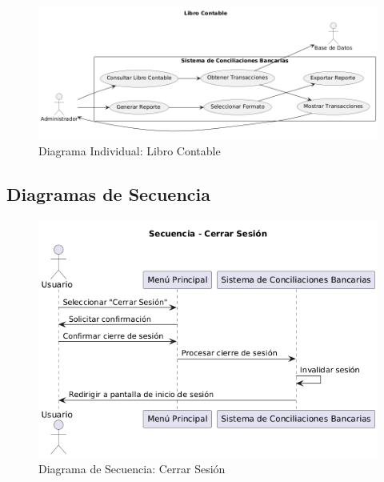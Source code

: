 \documentclass{article}
\begin{document}
\begin{figure}[H]
    \centering
    \includegraphics[width=\textwidth]{casos/LibroContable.png}
    \caption{Diagrama Individual: Libro Contable}
\end{figure}

\subsection{Diagramas de Secuencia}
\begin{figure}[H]
    \centering
    \includegraphics[width=\textwidth]{secuencia/CerrarSesion.png}
    \caption{Diagrama de Secuencia: Cerrar Sesión}
\end{figure}
\end{document}
